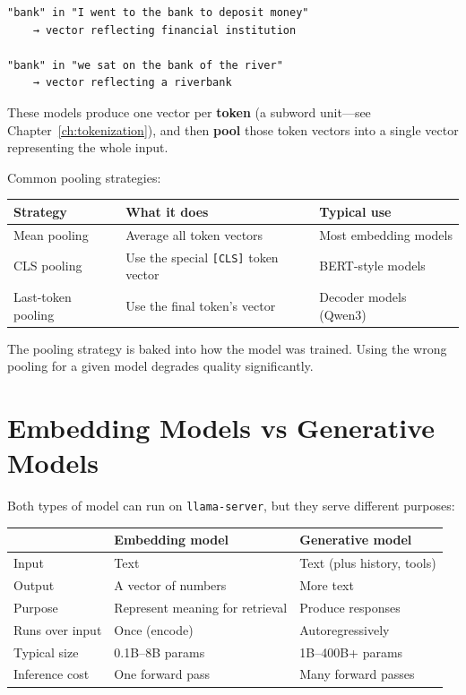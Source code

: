 \begin{Verbatim}
"bank" in "I went to the bank to deposit money"
    → vector reflecting financial institution

"bank" in "we sat on the bank of the river"
    → vector reflecting a riverbank
\end{Verbatim}

These models produce one vector per \textbf{token} (a subword unit---see
Chapter~\ref{ch:tokenization}), and then \textbf{pool} those token vectors into a single
vector representing the whole input.

Common pooling strategies:

\begin{center}
\begin{tabular}{lll}
\toprule
\textbf{Strategy} & \textbf{What it does} & \textbf{Typical use} \\
\midrule
Mean pooling & Average all token vectors & Most embedding models \\
CLS pooling & Use the special \texttt{[CLS]} token vector & BERT-style models \\
Last-token pooling & Use the final token's vector & Decoder models (Qwen3) \\
\bottomrule
\end{tabular}
\end{center}

The pooling strategy is baked into how the model was trained. Using the wrong pooling for a
given model degrades quality significantly.

\section{Embedding Models vs Generative Models}

Both types of model can run on \texttt{llama-server}, but they serve different purposes:

\begin{center}
\begin{tabular}{lll}
\toprule
& \textbf{Embedding model} & \textbf{Generative model} \\
\midrule
Input & Text & Text (plus history, tools) \\
Output & A vector of numbers & More text \\
Purpose & Represent meaning for retrieval & Produce responses \\
Runs over input & Once (encode) & Autoregressively \\
Typical size & 0.1B--8B params & 1B--400B+ params \\
Inference cost & One forward pass & Many forward passes \\
\bottomrule
\end{tabular}
\end{center}

